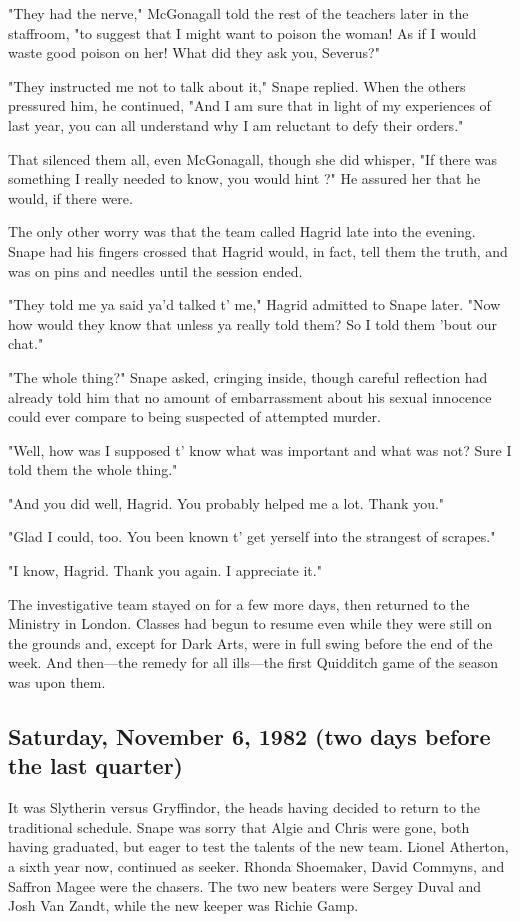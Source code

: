 "They had the nerve," McGonagall told the rest of the teachers later in the staffroom, "to suggest that I might want to poison the woman! As if I would waste good poison on her! What did they ask you, Severus?"

"They instructed me not to talk about it," Snape replied. When the others pressured him, he continued, "And I am sure that in light of my experiences of last year, you can all understand why I am reluctant to defy their orders."

That silenced them all, even McGonagall, though she did whisper, "If there was something I really needed to know, you would hint{\el} ?" He assured her that he would, if there were.

The only other worry was that the team called Hagrid late into the evening. Snape had his fingers crossed that Hagrid would, in fact, tell them the truth, and was on pins and needles until the session ended.

"They told me ya said ya'd talked t' me," Hagrid admitted to Snape later. "Now how would they know that unless ya really told them? So I told them 'bout our chat."

"The whole thing?" Snape asked, cringing inside, though careful reflection had already told him that no amount of embarrassment about his sexual innocence could ever compare to being suspected of attempted murder.

"Well, how was I supposed t' know what was important and what was not? Sure I told them the whole thing."

"And you did well, Hagrid. You probably helped me a lot. Thank you."

"Glad I could, too. You been known t' get yerself into the strangest of scrapes."

"I know, Hagrid. Thank you again. I appreciate it."

The investigative team stayed on for a few more days, then returned to the Ministry in London. Classes had begun to resume even while they were still on the grounds and, except for Dark Arts, were in full swing before the end of the week. And then—the remedy for all ills—the first Quidditch game of the season was upon them.

\subsection{Saturday, November 6, 1982 (two days before the last quarter)}

It was Slytherin versus Gryffindor, the heads having decided to return to the traditional schedule. Snape was sorry that Algie and Chris were gone, both having graduated, but eager to test the talents of the new team. Lionel Atherton, a sixth year now, continued as seeker. Rhonda Shoemaker, David Commyns, and Saffron Magee were the chasers. The two new beaters were Sergey Duval and Josh Van Zandt, while the new keeper was Richie Gamp.

